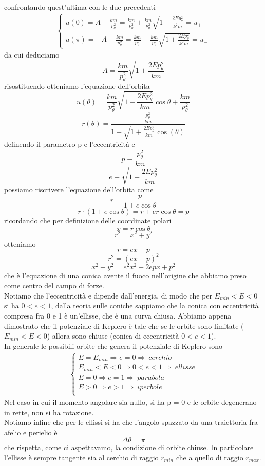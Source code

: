 \documentclass[
10pt, %
a4paper, %
oneside, %
headinclude,footinclude, %
BCOR5mm, %
]{scrartcl}
\begin{document}
confrontando quest'ultima con le due precedenti
\begin{align*}
	\begin{cases}
		u(0) = A+\frac{km}{p_\theta^2} = \frac{km}{p_\theta^2}+\frac{km}{p_\theta^2}\sqrt{1+\frac{2Ep_\theta^2}{k^2m}} = u_+ \\
		u(\pi) = -A+\frac{km}{p_\theta^2} = \frac{km}{p_\theta^2}-\frac{km}{p_\theta^2}\sqrt{1+\frac{2Ep_\theta^2}{k^2m}} = u_- 
	\end{cases}
\end{align*}	
da cui deduciamo 
\[A = \frac{km}{p_\theta^2}\sqrt{1+\frac{2Ep_\theta^2}{km}}\]
risostituendo otteniamo l'equazione dell'orbita
\[u(\theta) = \frac{km}{p_\theta^2}\sqrt{1+\frac{2Ep_\theta^2}{km}}\cos\theta+\frac{km}{p_\theta^2} \]
\[r(\theta) = \frac{\frac{p_\theta^2}{km}}{1+\sqrt{1+\frac{2Ep_\theta^2}{km}}\cos(\theta)} \]
definendo il parametro p e l'eccentricità e
\[p \equiv \frac{p_\theta^2}{km}\]
\[e \equiv  \sqrt{1+\frac{2Ep_\theta^2}{km}}\]
possiamo riscrivere l'equazione dell'orbita come
\[r = \frac{p}{1+e\cos\theta}\]
\[r\cdot(1+e\cos\theta) = r+er\cos\theta = p\]
ricordando che per definizione delle coordinate polari
\[x = r\cos\theta\]
\[r^2 = x^2+y^2\]
otteniamo
\[r = ex - p\]
\[r^2 = (ex - p)^2\]
\[x^2 + y^2 = e^2x^2-2epx + p^2\]
che è l'equazione di una conica avente il fuoco nell'origine che abbiamo preso come centro del campo di forze.\\
Notiamo che l'eccentricità e dipende dall'energia, di modo che per \(E_{min}<E<0\) si ha \(0<e<1\), dalla teoria sulle coniche sappiamo che la conica con eccentricità compresa fra 0 e 1 è un'ellisse, che è una curva chiusa. Abbiamo appena dimostrato che il potenziale di Keplero è tale che se le orbite sono limitate (\(E_{min}<E<0\)) allora sono chiuse (conica di eccentricità \(0<e<1\)).\\
In generale le possibili orbite che genera il potenziale di Keplero sono
\begin{align*}
	\begin{cases}
		E = E_{min}\Rightarrow e = 0\Rightarrow\ cerchio\\
		E_{min}<E<0\Rightarrow 0<e<1 \Rightarrow\ ellisse\\
		E=0\Rightarrow e=1 \Rightarrow\ parabola\\
		E>0\Rightarrow e>1 \Rightarrow\ iperbole\\
	\end{cases}
\end{align*}
Nel caso in cui il momento angolare sia nullo, si ha p = 0 e le orbite degenerano in rette, non si ha rotazione.\\
Notiamo infine che per le ellissi si ha che l'angolo spazzato da una traiettoria fra afelio e perielio è 
\[\Delta\theta = \pi\]
che rispetta, come ci aspettavamo, la condizione di orbite chiuse. In particolare l'ellisse è sempre tangente sia al cerchio di raggio \(r_{min}\) che a quello di raggio \(r_{max}\).
\end{document}
